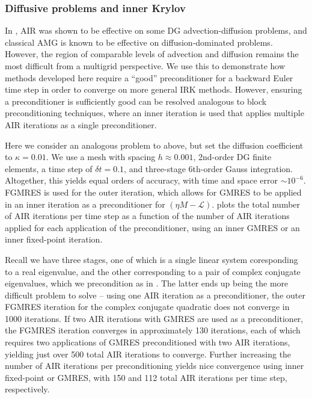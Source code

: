 \documentclass[review]{siamart}
\begin{document}
\subsubsection{Diffusive problems and inner Krylov}\label{sec:numerics_lin:dg:diff}

In \cite{AIR2}, AIR was shown to be effective on some DG advection-diffusion
problems, and classical AMG is known to be effective on diffusion-dominated
problems. However, the region of comparable levels of advection and diffusion
remains the most difficult from a multigrid perspective. We use this to 
demonstrate how methods developed here require a ``good'' preconditioner
for a backward Euler time step in order to converge on more general IRK
methods. However, ensuring a preconditioner is sufficiently good can be 
resolved analogous to block preconditioning techniques, where an inner
iteration is used that applies multiple AIR iterations as a single preconditioner.

Here we consider an analogous problem to above, but set the diffusion coefficient
to $\kappa = 0.01$. We use a mesh with spacing $h \approx 0.001$, 2nd-order
DG finite elements, a time step of $\delta t = 0.1$, and three-stage 6th-order
Gauss integration. Altogether, this yields equal orders of accuracy, with time and
space error $\sim10^{-6}$. FGMRES \cite{saad1993flexible} is used for the
outer iteration, which allows for GMRES to be applied in an inner iteration
as a preconditioner for $(\eta M - \mathcal{L})$.  plots the
total number of AIR iterations per time step as a function of the number of
AIR iterations applied for each application of the preconditioner, using an
inner GMRES or an inner fixed-point iteration. 

Recall we have three stages, one of which is a single linear system coresponding
to a real eigenvalue, and the other corresponding to a pair of complex conjugate
eigenvalues, which we precondition as in . The latter ends up being
the more difficult problem to solve -- using one AIR iteration as a preconditioner,
the outer FGMRES iteration for the complex conjugate quadratic does not converge in
1000 iterations. If two AIR iterations with GMRES are used as a preconditioner,
the FGMRES iteration converges in approximately 130 iterations, each of which
requires two applications of GMRES preconditioned with two AIR iterations,
yielding just over 500 total AIR iterations to converge. Further increasing
the number of AIR iterations per preconditioning yields nice convergence
using inner fixed-point or GMRES, with 150 and 112 total AIR iterations per
time step, respectively. 
\end{document}
